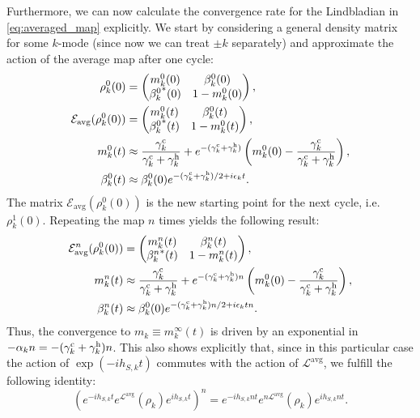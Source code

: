 Furthermore, we can now calculate the convergence rate for the Lindbladian in \cref{eq:averaged_map} explicitly. We start by considering a general density matrix for some $k$-mode (since now we can treat $\pm k$ separately) and approximate the action of the average map after one cycle:
\begin{align}
    \rho_k^0(0)                         &=\begin{pmatrix}
                                              m_k^0(0)         &\beta_k^0(0)\\
                                              {\beta_k^0}^*(0) &1-m_k^0(0)
                                          \end{pmatrix},\\
    \mathcal{E}_\text{avg}(\rho_k^0(0)) &=\begin{pmatrix}
                                              m_k^0(t)          &\beta_k^0(t)\\
                                              {\beta_k^0}^* (t) &1-m_k^0(t)
                                          \end{pmatrix},\\
    m_k^0(t)                            &\approx\frac{\gamma_k^{\rm c}}{\gamma_k^{\rm c}+\gamma_k^{\rm h}}+e^{-(\gamma_k^{\rm c}+\gamma_k^{\rm h})}\left(m_k^0(0)-\frac{\gamma_k^{\rm c}}{\gamma_k^{\rm c}+\gamma_k^{\rm h}}\right),\\
    \beta_k^0(t)                        &\approx\beta_k^0(0)e^{-(\gamma_k^{\rm c}+\gamma_k^{\rm h})/2+i\epsilon_k t}.
\end{align}
The matrix $\mathcal{E}_\text{avg}(\rho_k^0(0))$ is the new starting point for the next cycle, i.e. $\rho_k^1(0)$. Repeating the map $n$ times yields the following result:
\begin{align}
    \mathcal{E}_\text{avg}^n(\rho_k^0(0)) &=\begin{pmatrix}
                                                m_k^n(t)         &\beta_k^n(t)\\
                                                {\beta_k^n}^*(t) &1-m_k^n(t)
                                            \end{pmatrix},\\
    m_k^n(t)                              &\approx\frac{\gamma_k^{\rm c}}{\gamma_k^{\rm c}+\gamma_k^{\rm h}}+e^{-(\gamma_k^{\rm c}+\gamma_k^{\rm h})n}\left(m_k^0(0)-\frac{\gamma_k^{\rm c}}{\gamma_k^{\rm c}+\gamma_k^{\rm h}}\right),\\
    \beta_k^n(t)                          &\approx\beta_k^0(0)e^{-(\gamma_k^{\rm c}+\gamma_k^{\rm h})n/2+i\epsilon_k t n}.
\end{align}
Thus, the convergence to $m_k\equiv m_k^\infty(t)$ is driven by an exponential in $-\alpha_k n=-(\gamma_k^{\rm c}+\gamma_k^{\rm h})n$. This also shows explicitly that, since in this particular case the action of $\exp(-ih_{S,k} t)$ commutes with the action of $\mathcal{L}^\text{avg}$, we fulfill the following identity:
\begin{equation}
    \left(e^{-ih_{S,k} t}e^{\mathcal{L}^\text{avg}}(\rho_k)e^{i h_{S,k} t}\right)^n=e^{-ih_{S,k} n t}e^{n\mathcal{L}^\text{avg}}(\rho_k)e^{i h_{S,k} n t}.
\end{equation}

